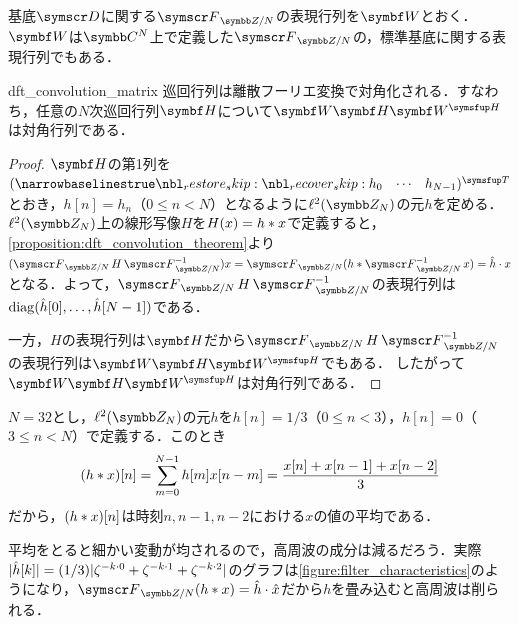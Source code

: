 \documentclass[../../main]{subfiles}
\begin{document}
基底\(\basis{D}\)に関する\(\dft{N}\)の表現行列を\(\mat{W}\)とおく．\(\mat{W}\)は\(\numset{C}^N\)上で定義した\(\dft{N}\)の，標準基底に関する表現行列でもある．

\begin{corollary}{}{dft_convolution_matrix}
  巡回行列は離散フーリエ変換で対角化される．すなわち，任意の\(N\)次巡回行列\(\mat{H}\)について\(\mat{W}\mat{H}\htrps{\mat{W}}\)は対角行列である．
\end{corollary}

\begin{proof}
  \(\mat{H}\)の第1列を\(\trps{\rowvect{h_0 & \cdots & h_{N-1}}}\)とおき，\(h[n]=h_n\)（\(0\leq n<N\)）となるように\(\cycles{N}\)の元\(h\)を定める．
  \(\cycles{N}\)上の線形写像\(H\)を\(H(x)=h\ast x\)で定義すると，\cref{proposition:dft_convolution_theorem}より\((\dft{N}H\dft*{N})x=\dft{N}(h\circconv\dft*{N}x)=\hat{h}\cdot x\)となる．よって，\(\dft{N}H\dft*{N}\)の表現行列は\(\operatorname{diag}(\hat{h}[0],\dots,\hat{h}[N-1])\)である．

  一方，\(H\)の表現行列は\(\mat{H}\)だから\(\dft{N}H\dft*{N}\)の表現行列は\(\mat{W}\mat{H}\htrps{\mat{W}}\)でもある．
  したがって\(\mat{W}\mat{H}\htrps{\mat{W}}\)は対角行列である．
\end{proof}

\begin{example}
  \label{example:cyclic_filter}
  \(N=32\)とし，\(\cycles{N}\)の元\(h\)を\(h[n]=1/3\)（\(0\leq n<3\)），\(h[n]=0\)（\(3\leq n<N\)）で定義する．このとき
  \[
    (h\ast x)[n] = \sum_{m=0}^{N-1}h[m]x[n-m]
    = \frac{x[n]+x[n-1]+x[n-2]}{3}
  \]
  だから，\((h\ast x)[n]\)は時刻\(n,n-1,n-2\)における\(x\)の値の平均である．

  平均をとると細かい変動が均されるので，高周波の成分は減るだろう．実際\(\lvert\hat{h}[k]\rvert=(1/3)\lvert\zeta^{-k\cdot 0}+\zeta^{-k\cdot 1}+\zeta^{-k\cdot 2}\rvert\)のグラフは\cref{figure:filter_characteristics}のようになり，\(\dft{N}(h\circconv x)=\hat{h}\cdot\hat{x}\)だから\(h\)を畳み込むと高周波は削られる．
\end{example}
\end{document}
